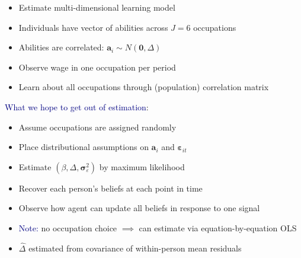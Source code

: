 \documentclass[aspectratio=169]{beamer}
\begin{document}
\begin{frame}

\begin{itemize}
\itemsep1.5em
\item<1-> Estimate multi-dimensional learning model
\item<2-> Individuals have vector of abilities across $J=6$ occupations
\item<3-> Abilities are correlated: $\mathbf{a}_i \sim N(\mathbf{0}, \Delta)$
\item<4-> Observe wage in one occupation per period
\item<5-> Learn about all occupations through (population) correlation matrix
\end{itemize}

\end{frame}




\begin{frame}

\textcolor{navy}{What we hope to get out of estimation}:
\bigskip

\begin{itemize}
\itemsep1.5em
\item<2-> Assume occupations are assigned randomly
\item<3-> Place distributional assumptions on $\mathbf{a}_i$ and $\boldsymbol{\varepsilon}_{it}$
\item<4-> Estimate $(\beta,\Delta,\boldsymbol{\sigma}^2_\varepsilon)$ by maximum likelihood
\item<5-> Recover each person's beliefs at each point in time
\item<6-> Observe how agent can update all beliefs in response to one signal
\item<7-> \textcolor{navy}{Note:} no occupation choice $\implies$ can estimate via equation-by-equation OLS
\item<8-> $\hat{\Delta}$ estimated from covariance of within-person mean residuals
\end{itemize}

\end{frame}
\end{document}
